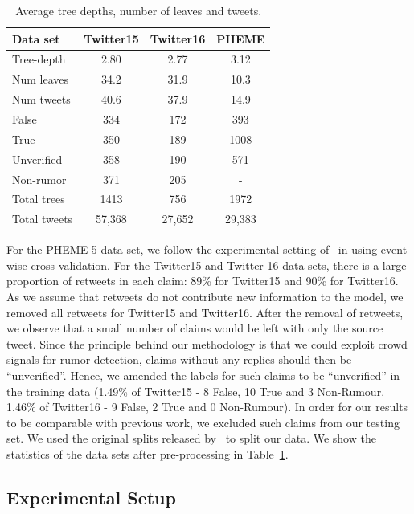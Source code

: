 \documentclass[letterpaper]{article} %
\begin{document}
\begin{table}
\centering
\small
\begin{tabular}{lccc} \toprule
Data set    & Twitter15 & Twitter16 & PHEME \\ \midrule
Tree-depth  & 2.80      & 2.77      & 3.12  \\
Num leaves  & 34.2      & 31.9      & 10.3  \\
Num tweets  & 40.6      & 37.9      & 14.9  \\ 
False       & 334       & 172       & 393 \\
True        & 350       & 189       & 1008 \\
Unverified  & 358       & 190       & 571 \\
Non-rumor   & 371       & 205       & - \\
Total trees & 1413      & 756       & 1972 \\
Total tweets& 57,368    & 27,652    & 29,383\\
\bottomrule
\end{tabular}
\caption{Average tree depths, number of leaves and tweets.}
\label{tab:data_tree_analysis}
\end{table}

For the PHEME 5 data set, we follow the experimental setting of~\citet{kumar19} in using event wise cross-validation.
For the Twitter15 and Twitter 16 data sets, there is a large proportion of retweets in each claim: 89\% for Twitter15 and 90\% for Twitter16. As we assume that retweets do not contribute new information to the model, we removed all retweets for Twitter15 and Twitter16. After the removal of retweets, we observe that a small number of claims would be left with only the source tweet. Since the principle behind our methodology is that we could exploit crowd signals for rumor detection, claims without any replies should then be ``unverified''. Hence, we amended the labels for such claims to be ``unverified'' in the training data (1.49\% of Twitter15 - 8 False, 10 True and 3 Non-Rumour. 1.46\% of Twitter16 - 9 False, 2 True and 0 Non-Rumour). In order for our results to be comparable with previous work, we excluded such claims from our testing set. We used the original splits released by~\cite{ma18} to split our data.  
We show the statistics of the data sets after pre-processing in Table~\ref{tab:data_tree_analysis}.

\subsection{Experimental Setup}
\end{document}
